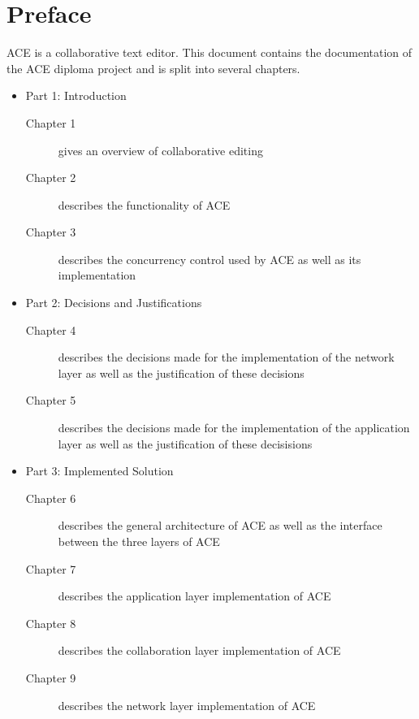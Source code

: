 \chapter{Preface}
\label{chapter:preface}

ACE is a collaborative text editor. This document contains the documentation
of the ACE diploma project and is split into several chapters.

\begin{itemize}
 \item Part 1: Introduction
 \begin{description}
  \item[Chapter 1] gives an overview of collaborative editing
  \item[Chapter 2] describes the functionality of ACE
  \item[Chapter 3] describes the concurrency control used by ACE as well as
                   its implementation
 \end{description}
 
 \item Part 2: Decisions and Justifications
 \begin{description}
  \item[Chapter 4] describes the decisions made for the implementation of the
                   network layer as well as the justification of these decisions
  \item[Chapter 5] describes the decisions made for the implementation of the
                   application layer as well as the justification of these
                   decisisions
 \end{description}
 
 \item Part 3: Implemented Solution
 \begin{description}
  \item[Chapter 6] describes the general architecture of ACE as well as the
                   interface between the three layers of ACE
  \item[Chapter 7] describes the application layer implementation of ACE
  \item[Chapter 8] describes the collaboration layer implementation of ACE
  \item[Chapter 9] describes the network layer implementation of ACE
 \end{description}
 

\end{itemize}
